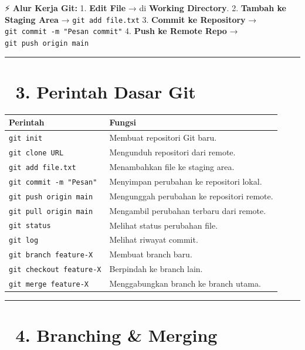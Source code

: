 \documentclass[
  letterpaper,
  DIV=11,
  numbers=noendperiod]{scrreprt}
\begin{document}
⚡ \textbf{Alur Kerja Git:} 1. \textbf{Edit File} → di \textbf{Working
Directory}. 2. \textbf{Tambah ke Staging Area} →
\texttt{git\ add\ file.txt} 3. \textbf{Commit ke Repository} →
\texttt{git\ commit\ -m\ "Pesan\ commit"} 4. \textbf{Push ke Remote
Repo} → \texttt{git\ push\ origin\ main}

\begin{center}\rule{0.5\linewidth}{0.5pt}\end{center}

\section{\texorpdfstring{🔹 \textbf{3. Perintah Dasar
Git}}{🔹 3. Perintah Dasar Git}}\label{perintah-dasar-git}

\begin{longtable}[]{@{}ll@{}}
\toprule\noalign{}
Perintah & Fungsi \\
\midrule\noalign{}
\endhead
\bottomrule\noalign{}
\endlastfoot
\texttt{git\ init} & Membuat repositori Git baru. \\
\texttt{git\ clone\ URL} & Mengunduh repositori dari remote. \\
\texttt{git\ add\ file.txt} & Menambahkan file ke staging area. \\
\texttt{git\ commit\ -m\ "Pesan"} & Menyimpan perubahan ke repositori
lokal. \\
\texttt{git\ push\ origin\ main} & Mengunggah perubahan ke repositori
remote. \\
\texttt{git\ pull\ origin\ main} & Mengambil perubahan terbaru dari
remote. \\
\texttt{git\ status} & Melihat status perubahan file. \\
\texttt{git\ log} & Melihat riwayat commit. \\
\texttt{git\ branch\ feature-X} & Membuat branch baru. \\
\texttt{git\ checkout\ feature-X} & Berpindah ke branch lain. \\
\texttt{git\ merge\ feature-X} & Menggabungkan branch ke branch
utama. \\
\end{longtable}

\begin{center}\rule{0.5\linewidth}{0.5pt}\end{center}

\section{\texorpdfstring{🔹 \textbf{4. Branching \&
Merging}}{🔹 4. Branching \& Merging}}\label{branching-merging}
\end{document}
